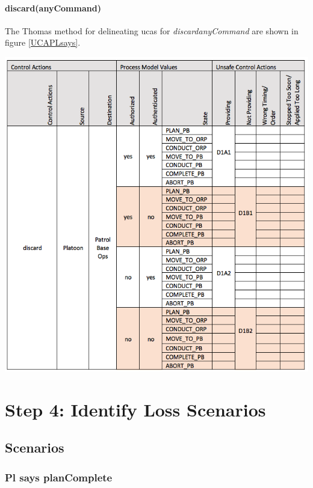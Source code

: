 \documentclass[../../main/main.tex]{subfiles}
\begin{document}
\paragraph*{discard(anyCommand)}
The Thomas method for delineating \glspl{uca} for \textit{discard{anyCommand}} are shown in figure \ref{UCAPLsays}.
\begin{table}[ht!]
\begin{center}
\includegraphics[width=\linewidth]{../figures/ucadiscards}
\caption{Unsafe control actions \glspl{uca} for control action "discard(anyCommand)."}
\label{UCAdiscard}
\end{center}
\end{table}
\clearpage
\section{Step 4: Identify Loss Scenarios}\label{chp:stpapb:scenarios}
\subsection{Scenarios}

\subsubsection*{Pl says planComplete}
\clearpage
\end{document}
